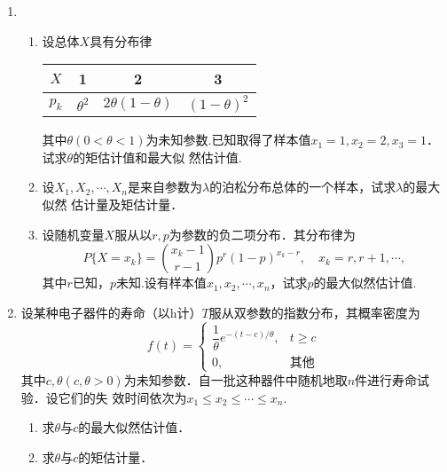 \documentclass[10pt,a4paper]{article}
\begin{document}
\begin{enumerate}
    \item \begin{enumerate}
        \item 设总体$X$具有分布律
        \renewcommand{\arraystretch}{1.3}
        \begin{table}[H]\centering
            \begin{tabular}{c|ccc}
            $X$   & 1            & 2          & 3                                 \\ \hline
            $p_k$ & $\theta^2$ & $2\theta(1-\theta)$ & $(1-\theta)^2$ 
            \end{tabular}
        \end{table}
        \renewcommand{\arraystretch}{1.0}
        其中$\theta(0<\theta<1)$为未知参数.已知取得了样本值$x_1=1,x_2=2,x_3=1$．试求$\theta$的矩估计值和最大似
        然估计值.
        \item 设$X_1,X_2,\cdots,X_n$是来自参数为$\lambda$的泊松分布总体的一个样本，试求$\lambda$的最大似然
        估计量及矩估计量．
        \item 设随机变量$X$服从以$r,p$为参数的负二项分布．其分布律为
        $$P\{X=x_k\}=\binom{x_k-1}{r-1}p^r(1-p)^{x_k-r},\quad x_k=r,r+1,\cdots,$$
        其中$r$已知，$p$未知.设有样本值$x_1,x_2,\cdots,x_n$，试求$p$的最大似然估计值. 
    \end{enumerate}
    \clearpage



    \item 设某种电子器件的寿命（以h计）$T$服从双参数的指数分布，其概率密度为
    $$f(t)=\left\{\begin{array}{ll}
        \dfrac{1}{\theta} e^{-(t-c)/\theta}, & t\geq c\\
        0, & \mbox{其他}
    \end{array}\right.$$
    其中$c,\theta(c,\theta>0)$为未知参数．自一批这种器件中随机地取$n$件进行寿命试验．设它们的失
    效时间依次为$x_1\leq x_2\leq \cdots \leq x_n$.
    \begin{enumerate}
        \item 求$\theta$与$c$的最大似然估计值．
        \item 求$\theta$与$c$的矩估计量．
    \end{enumerate}
    \clearpage




\end{enumerate}
\end{document}

